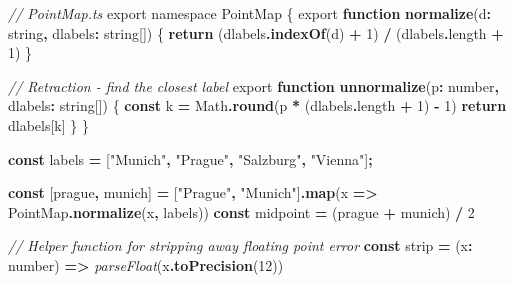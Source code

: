 \documentclass[
]{book}
\newenvironment{Shaded}{\begin{snugshade}}{\end{snugshade}}
\newcommand{\AttributeTok}[1]{\textcolor[rgb]{0.13,0.29,0.53}{#1}}
\newcommand{\BuiltInTok}[1]{#1}
\newcommand{\CommentTok}[1]{\textcolor[rgb]{0.56,0.35,0.01}{\textit{#1}}}
\newcommand{\ControlFlowTok}[1]{\textcolor[rgb]{0.13,0.29,0.53}{\textbf{#1}}}
\newcommand{\DataTypeTok}[1]{\textcolor[rgb]{0.13,0.29,0.53}{#1}}
\newcommand{\DecValTok}[1]{\textcolor[rgb]{0.00,0.00,0.81}{#1}}
\newcommand{\FunctionTok}[1]{\textcolor[rgb]{0.13,0.29,0.53}{\textbf{#1}}}
\newcommand{\ImportTok}[1]{#1}
\newcommand{\KeywordTok}[1]{\textcolor[rgb]{0.13,0.29,0.53}{\textbf{#1}}}
\newcommand{\NormalTok}[1]{#1}
\newcommand{\OperatorTok}[1]{\textcolor[rgb]{0.81,0.36,0.00}{\textbf{#1}}}
\newcommand{\PreprocessorTok}[1]{\textcolor[rgb]{0.56,0.35,0.01}{\textit{#1}}}
\newcommand{\StringTok}[1]{\textcolor[rgb]{0.31,0.60,0.02}{#1}}
\theoremstyle{definition}
\theoremstyle{definition}
\theoremstyle{definition}
\theoremstyle{definition}
\theoremstyle{remark}
\begin{document}
\begin{Shaded}
\begin{Highlighting}[]
\CommentTok{// PointMap.ts}
\ImportTok{export} \ImportTok{namespace} \DataTypeTok{PointMap}\NormalTok{ \{}
  \ImportTok{export} \KeywordTok{function} \FunctionTok{normalize}\NormalTok{(d}\OperatorTok{:} \DataTypeTok{string}\OperatorTok{,}\NormalTok{ dlabels}\OperatorTok{:} \DataTypeTok{string}\NormalTok{[]) \{}
    \ControlFlowTok{return}\NormalTok{ (dlabels}\OperatorTok{.}\FunctionTok{indexOf}\NormalTok{(d) }\OperatorTok{+} \DecValTok{1}\NormalTok{) }\OperatorTok{/}\NormalTok{ (dlabels}\OperatorTok{.}\AttributeTok{length} \OperatorTok{+} \DecValTok{1}\NormalTok{)}
\NormalTok{  \}}
  
  \CommentTok{// Retraction {-} find the closest label}
  \ImportTok{export} \KeywordTok{function} \FunctionTok{unnormalize}\NormalTok{(p}\OperatorTok{:} \DataTypeTok{number}\OperatorTok{,}\NormalTok{ dlabels}\OperatorTok{:} \DataTypeTok{string}\NormalTok{[]) \{}
    \KeywordTok{const}\NormalTok{ k }\OperatorTok{=} \BuiltInTok{Math}\OperatorTok{.}\FunctionTok{round}\NormalTok{(p }\OperatorTok{*}\NormalTok{ (dlabels}\OperatorTok{.}\AttributeTok{length} \OperatorTok{+} \DecValTok{1}\NormalTok{) }\OperatorTok{{-}} \DecValTok{1}\NormalTok{)}
    \ControlFlowTok{return}\NormalTok{ dlabels[k]}
\NormalTok{  \}}
\NormalTok{\}}

\KeywordTok{const}\NormalTok{ labels }\OperatorTok{=}\NormalTok{ [}\StringTok{"Munich"}\OperatorTok{,} \StringTok{"Prague"}\OperatorTok{,} \StringTok{"Salzburg"}\OperatorTok{,} \StringTok{"Vienna"}\NormalTok{]}\OperatorTok{;}

\KeywordTok{const}\NormalTok{ [prague}\OperatorTok{,}\NormalTok{ munich] }\OperatorTok{=}\NormalTok{ [}\StringTok{"Prague"}\OperatorTok{,} \StringTok{"Munich"}\NormalTok{]}\OperatorTok{.}\FunctionTok{map}\NormalTok{(x }\KeywordTok{=\textgreater{}}\NormalTok{ PointMap}\OperatorTok{.}\FunctionTok{normalize}\NormalTok{(x}\OperatorTok{,}\NormalTok{ labels))}
\KeywordTok{const}\NormalTok{ midpoint }\OperatorTok{=}\NormalTok{ (prague }\OperatorTok{+}\NormalTok{ munich) }\OperatorTok{/} \DecValTok{2}

\CommentTok{// Helper function for stripping away floating point error }
\KeywordTok{const}\NormalTok{ strip }\OperatorTok{=}\NormalTok{ (x}\OperatorTok{:} \DataTypeTok{number}\NormalTok{) }\KeywordTok{=\textgreater{}} \PreprocessorTok{parseFloat}\NormalTok{(x}\OperatorTok{.}\FunctionTok{toPrecision}\NormalTok{(}\DecValTok{12}\NormalTok{))}


\end{Highlighting}
\end{Shaded}
\end{document}
